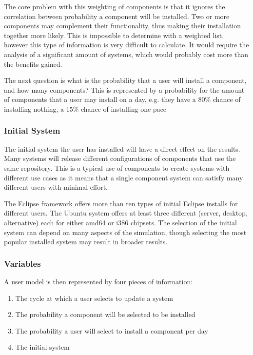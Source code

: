 The core problem with this weighting of components is that it ignores the correlation between probability a component will be installed. 
Two or more components may complement their functionality, thus making their installation together more likely.
This is impossible to determine with a weighted list, however this type of information is very difficult to calculate.
It would require the analysis of a significant amount of systems, which would probably cost more than the benefits gained.

The next question is what is the probability that a user will install a component, and how many components?
This is represented by a probability for the amount of components that a user may install on a day,
e.g. they have a 80\% chance of installing nothing, a 15\% chance of installing one pace

\subsubsection{Initial System}
The initial system the user has installed will have a direct effect on the results.
Many systems will release different configurations of components that use the same repository.
This is a typical use of components to create systems with different use cases as it means that a single component system can satisfy many different users with minimal effort.

The Eclipse framework offers more than ten types of initial Eclipse installs for different users.
The Ubuntu system offers at least three different (server, desktop, alternative) each for either amd64 or i386 chipsets.
The selection of the initial system can depend on many aspects of the simulation, 
though selecting the most popular installed system may result in broader results. 

\subsubsection{Variables}
A user model is then represented by four pieces of information:
\begin{enumerate}
  \item The cycle at which a user selects to update a system
  \item The probability a component will be selected to be installed
  \item The probability a user will select to install a component per day
  \item The initial system
\end{enumerate}


